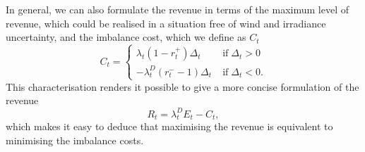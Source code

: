 In general, we can also formulate the revenue in terms of the maximum level of revenue, which could be realised in a situation free of wind and irradiance uncertainty, and the imbalance cost, which we define as $C_{t}$
\begin{equation*}
	C_{t}=\begin{cases}
		\lambda_{t}\left(1-r_{t}^{+}\right)\Delta_{t} &\mathrm{\; if \;} \Delta_{t}>0
		\\ -\lambda_{t}^{D}\left(r_{t}^{-}-1\right)\Delta_{t} &\mathrm{\; if \;} \Delta_{t}<0.
	\end{cases}
\end{equation*}
This characterisation renders it possible to give a more concise formulation of the revenue 
\begin{equation*}
	R_{t}=\lambda_{t}^{D}E_{t}-C_{t},
\end{equation*}
which makes it easy to deduce that maximising the revenue is equivalent to minimising the imbalance costs. 
\\ \\


